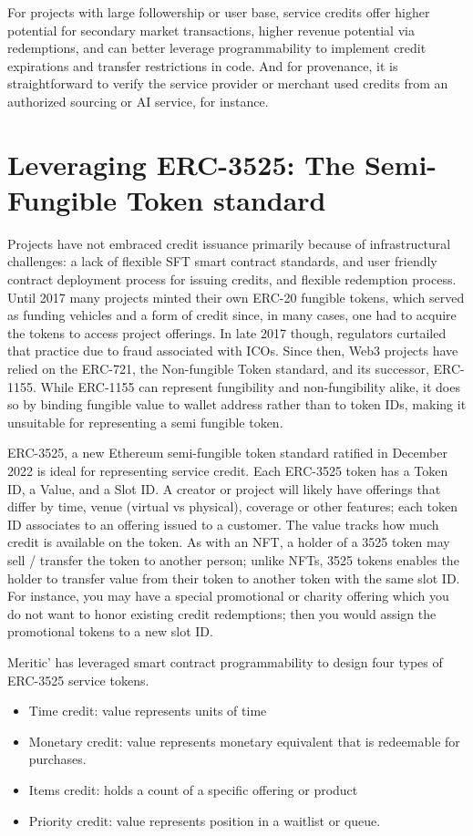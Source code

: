 \documentclass[twoside]{article}
\begin{document}
For projects  with large followership or user base, service  credits offer higher potential for secondary market transactions, higher revenue potential via redemptions, and can better leverage programmability to implement credit expirations and transfer restrictions in code. And for provenance, it is straightforward to verify the service provider or merchant used credits from an authorized  sourcing or AI service, for instance. 

\section{Leveraging ERC-3525: The Semi-Fungible Token standard}
Projects  have not embraced credit issuance primarily because of infrastructural challenges: a lack of flexible SFT smart contract standards, and user friendly contract deployment process for issuing credits, and flexible redemption process. Until 2017 many projects minted their own ERC-20 fungible tokens, which served as funding vehicles and a form of credit since, in many cases, one had to acquire the tokens to access project offerings.  In late 2017 though, regulators curtailed that practice due to fraud associated with ICOs. Since then, Web3 projects  have relied on the ERC-721, the Non-fungible Token standard, and its successor, ERC-1155. While ERC-1155 can represent  fungibility  and non-fungibility alike, it does so by binding fungible value to wallet address rather than to token IDs, making it unsuitable for representing a semi fungible token.

ERC-3525, a new Ethereum semi-fungible token standard ratified in December 2022 is ideal for representing service credit. Each ERC-3525 token has a Token  ID, a Value, and a Slot ID. A creator or project will likely have offerings that differ by time, venue (virtual vs physical), coverage  or other features; each token ID associates to an offering issued to a customer. The value tracks how much credit is available on the token. As with an NFT, a holder of a 3525 token may sell / transfer  the token to another person; unlike NFTs, 3525 tokens enables the holder to transfer value from their token to another token with the same slot ID. For instance, you may have a special promotional or charity offering which you do not want to honor existing credit redemptions; then you would assign the promotional tokens to a new slot ID. 

Meritic’ has leveraged smart contract programmability to design four types of ERC-3525 service tokens.  
\begin{itemize}
\item Time credit: value represents units of time
\item Monetary credit: value represents monetary equivalent that is redeemable for purchases.
\item Items credit: holds a count of a specific offering or product 
\item Priority credit: value represents position in a waitlist or queue.
\end{itemize}
\end{document}
